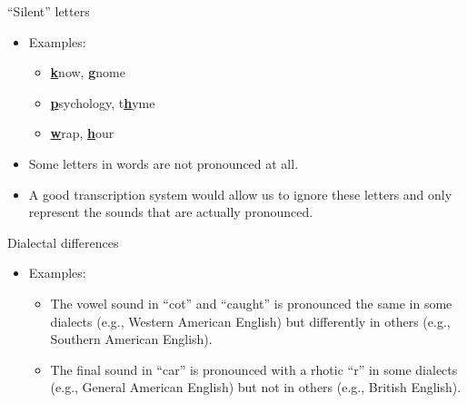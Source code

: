 \documentclass[professionalfonts]{beamer}
\begin{document}
\begin{frame}{``Silent'' letters}
    \begin{itemize}
        \item Examples:
        \begin{itemize}
            \item \underline{\textbf{k}}now, \underline{\textbf{g}}nome
            \item \underline{\textbf{p}}sychology, t\underline{\textbf{h}}yme
            \item \underline{\textbf{w}}rap, \underline{\textbf{h}}our
        \end{itemize}
        \item Some letters in words are not pronounced at all.
        \item A good transcription system would allow us to ignore these letters and only represent the sounds that are actually pronounced.
    \end{itemize}
\end{frame}

\begin{frame}{Dialectal differences}
    \begin{itemize}
        \item Examples:
        \begin{itemize}
            \item The vowel sound in ``cot'' and ``caught'' is pronounced the same in some dialects (e.g., Western American English) but differently in others (e.g., Southern American English).
            \item The final sound in ``car'' is pronounced with a rhotic ``r'' in some dialects (e.g., General American English) but not in others (e.g., British English).
        \end{itemize}

    \end{itemize}
\end{frame}
\end{document}
